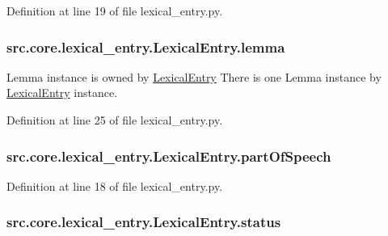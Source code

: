 Definition at line 19 of file lexical\+\_\+entry.\+py.

\hypertarget{classsrc_1_1core_1_1lexical__entry_1_1_lexical_entry_a616298be2e81b660fc8e6eccd7c4dcfb}{
\subsubsection[{lemma}]{\setlength{\rightskip}{0pt plus 5cm}src.\+core.\+lexical\+\_\+entry.\+Lexical\+Entry.\+lemma}}\label{classsrc_1_1core_1_1lexical__entry_1_1_lexical_entry_a616298be2e81b660fc8e6eccd7c4dcfb}


Lemma instance is owned by \hyperlink{classsrc_1_1core_1_1lexical__entry_1_1_lexical_entry}{Lexical\+Entry} There is one Lemma instance by \hyperlink{classsrc_1_1core_1_1lexical__entry_1_1_lexical_entry}{Lexical\+Entry} instance. 



Definition at line 25 of file lexical\+\_\+entry.\+py.

\hypertarget{classsrc_1_1core_1_1lexical__entry_1_1_lexical_entry_a9f7833c971ca31885d3d7383fb394d03}{
\subsubsection[{part\+Of\+Speech}]{\setlength{\rightskip}{0pt plus 5cm}src.\+core.\+lexical\+\_\+entry.\+Lexical\+Entry.\+part\+Of\+Speech}}\label{classsrc_1_1core_1_1lexical__entry_1_1_lexical_entry_a9f7833c971ca31885d3d7383fb394d03}


Definition at line 18 of file lexical\+\_\+entry.\+py.

\hypertarget{classsrc_1_1core_1_1lexical__entry_1_1_lexical_entry_a661ab019b1e1fde2f86158a566eba3fd}{
\subsubsection[{status}]{\setlength{\rightskip}{0pt plus 5cm}src.\+core.\+lexical\+\_\+entry.\+Lexical\+Entry.\+status}}\label{classsrc_1_1core_1_1lexical__entry_1_1_lexical_entry_a661ab019b1e1fde2f86158a566eba3fd}


